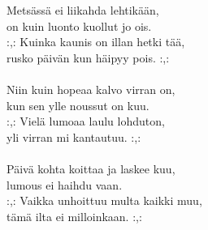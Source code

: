 
        Metsässä ei liikahda lehtikään, \\
        on kuin luonto kuollut jo ois. \\
        :,: Kuinka kaunis on illan hetki tää, \\
        rusko päivän kun häipyy pois. :,: \\
\hspace{10mm} \\
        Niin kuin hopeaa kalvo virran on, \\
        kun sen ylle noussut on kuu. \\
        :,: Vielä lumoaa laulu lohduton, \\
        yli virran mi kantautuu. :,: \\
\hspace{10mm} \\
        Päivä kohta koittaa ja laskee kuu, \\
        lumous ei haihdu vaan. \\
        :,: Vaikka unhoittuu multa kaikki muu, \\
        tämä ilta ei milloinkaan. :,: \\
